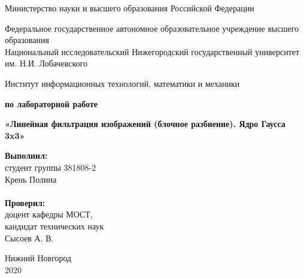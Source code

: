\documentclass{report}
\begin{document}
\begin{titlepage}

\begin{center}
Министерство науки и высшего образования Российской Федерации
\end{center}

\begin{center}
Федеральное государственное автономное образовательное учреждение высшего образования \\
Национальный исследовательский Нижегородский государственный университет им. Н.И. Лобачевского
\end{center}

\begin{center}
Институт информационных технологий, математики и механики
\end{center}

\vspace{4em}

\begin{center}
\textbf{ по лабораторной работе} \\
\end{center}
\begin{center}
\textbf{\Large«Линейная фильтрация изображений (блочное разбиение). Ядро Гаусса 3x3»} \\
\end{center}

\vspace{4em}

\newbox{\lbox}
\newlength{\maxl}
\setlength{\maxl}{\wd\lbox}
\hfill\parbox{7cm}{
\hspace*{5cm}\hspace*{-5cm}\textbf{Выполнил:} \\ студент группы 381808-2 \\ Крень Полина\\
\\
\hspace*{5cm}\hspace*{-5cm}\textbf{Проверил:}\\ доцент кафедры МОСТ, \\ кандидат технических наук \\ Сысоев А. В.\\
}
\vspace{\fill}

\begin{center} Нижний Новгород \\ 2020 \end{center}

\end{titlepage}
\end{document}
